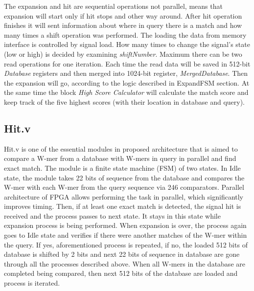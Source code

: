 The expansion and hit are sequential operations not parallel, means that expansion will start only if hit stops and other way around.  After hit operation finishes it will sent information about where in query there is a match and how many times a shift operation was performed.  The loading the data from memory interface is controlled by signal load. How many times to change the signal’s state (low or high) is decided by examining \textit{shiftNumber}. Maximum there can be two read operations for one iteration. Each time the read data will be saved in 512-bit \textit{Database} registers and then merged into 1024-bit register, \textit{MergedDatabase}. Then the expansion will go, according to the logic described in ExpandFSM section. 
At the same time the block \textit{High Score Calculator} will calculate the match score and keep track of the five highest scores (with their location in database and query).    



\subsection{Hit.v}
Hit.v is one of the essential modules in proposed architecture that is aimed to compare a W-mer from a database with W-mers in query in parallel and find exact match. The module is a finite state machine (FSM) of two states. In Idle state, the module takes 22 bits of sequence from the database and compares the W-mer with each W-mer from the query sequence via 246 comparators. Parallel architecture of FPGA allows performing the task in parallel, which significantly improves timing. Then, if at least one exact match is detected, the signal hit is received and the process passes to next state. It stays in this state while expansion process is being performed. When expansion is over, the process again goes to Idle state and verifies if there were another matches of the W-mer within the query. If yes, aforementioned process is repeated, if no, the loaded 512 bits of database is shifted by 2 bits and next 22 bits of sequence in database are gone through all the processes described above. When all W-mers in the database are completed being compared, then next 512 bits of the database are loaded and process is iterated. 
